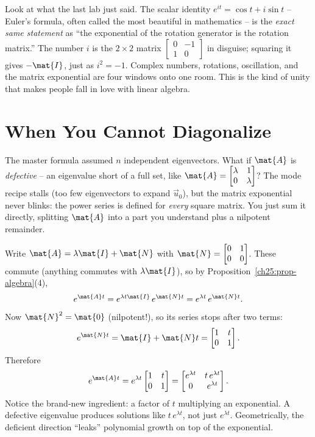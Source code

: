 \begin{aestheticbox}
Look at what the last lab just said. The scalar identity $e^{it}=\cos t + i\sin t$
-- Euler's formula, often called the most beautiful in mathematics -- is the
\emph{exact same statement} as ``the exponential of the rotation generator is the
rotation matrix.'' The number $i$ is the $2\times2$ matrix
$\begin{bmatrix}0&-1\\1&0\end{bmatrix}$ in disguise; squaring it gives $-\mat{I}$,
just as $i^2=-1$. Complex numbers, rotations, oscillation, and the matrix
exponential are four windows onto one room. This is the kind of unity that makes
people fall in love with linear algebra.
\end{aestheticbox}

\section{When You Cannot Diagonalize}
\label{ch25:defective}

The master formula assumed $n$ independent eigenvectors. What if $\mat{A}$ is
\emph{defective} -- an eigenvalue short of a full set, like
$\mat{A}=\begin{bmatrix}\lambda&1\\0&\lambda\end{bmatrix}$? The mode recipe stalls
(too few eigenvectors to expand $\vec{u}_0$), but the matrix exponential never
blinks: the power series is defined for \emph{every} square matrix. You just sum
it directly, splitting $\mat{A}$ into a part you understand plus a nilpotent
remainder.

Write $\mat{A} = \lambda\mat{I} + \mat{N}$ with $\mat{N}=\begin{bmatrix}0&1\\0&0
\end{bmatrix}$. These commute (anything commutes with $\lambda\mat{I}$), so by
Proposition~\ref{ch25:prop-algebra}(4),
\[
  e^{\mat{A}t} = e^{\lambda t\mat{I}}\, e^{\mat{N}t}
  = e^{\lambda t}\, e^{\mat{N}t}.
\]
Now $\mat{N}^2 = \mat{0}$ (nilpotent!), so its series stops after two terms:
\[
  e^{\mat{N}t} = \mat{I} + \mat{N}t = \begin{bmatrix}1 & t\\ 0 & 1\end{bmatrix}.
\]
Therefore
\[
  e^{\mat{A}t} = e^{\lambda t}\begin{bmatrix}1 & t\\ 0 & 1\end{bmatrix}
  = \begin{bmatrix}e^{\lambda t} & t\,e^{\lambda t}\\ 0 & e^{\lambda t}\end{bmatrix}.
\]
Notice the brand-new ingredient: a factor of $t$ multiplying an exponential. A
defective eigenvalue produces solutions like $t\,e^{\lambda t}$, not just
$e^{\lambda t}$. Geometrically, the deficient direction ``leaks'' polynomial
growth on top of the exponential.


